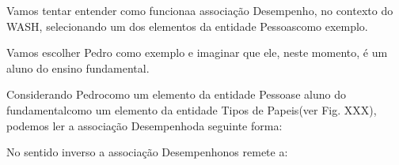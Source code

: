 \documentclass[
12pt,		%
openright,	%
twoside,  %
a4paper,			%
chapter=TITLE,		%
english,			%
french,				%
spanish,			%
brazil				%
]{USPSC-classe/USPSC}
\begin{document}
Vamos tentar entender como \textquotedbl funciona\textquotedbl  a associa\c{c}\~ao \textquotedbl Desempenho\textquotedbl , no contexto do WASH, selecionando um dos elementos da entidade \textquotedbl Pessoas\textquotedbl  como exemplo.














Vamos escolher Pedro como exemplo e imaginar que ele, neste momento, \'e um aluno do ensino fundamental.














Considerando \textquotedbl Pedro\textquotedbl  como um elemento da entidade \textquotedbl Pessoas\textquotedbl  e \textquotedbl aluno do fundamental\textquotedbl  como um elemento da entidade \textquotedbl Tipos de Papeis\textquotedbl  (ver Fig. XXX), podemos ler a associa\c{c}\~ao \textquotedbl Desempenho\textquotedbl  da seguinte forma:















\noindent\begin{center}\mbox{\centering{}}\end{center}


No sentido inverso a associa\c{c}\~ao \textquotedbl Desempenho\textquotedbl  nos remete a:















\noindent\begin{center}\mbox{\centering{}}\end{center}
\end{document}
